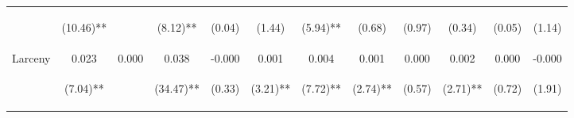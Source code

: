 \begin{tabular}{lccccccccccc}
 & \begin{footnotesize}(10.46)**\end{footnotesize} & \begin{footnotesize}\end{footnotesize} & \begin{footnotesize}(8.12)**\end{footnotesize} & \begin{footnotesize}(0.04)\end{footnotesize} & \begin{footnotesize}(1.44)\end{footnotesize} & \begin{footnotesize}(5.94)**\end{footnotesize} & \begin{footnotesize}(0.68)\end{footnotesize} & \begin{footnotesize}(0.97)\end{footnotesize} & \begin{footnotesize}(0.34)\end{footnotesize} & \begin{footnotesize}(0.05)\end{footnotesize} & \begin{footnotesize}(1.14)\end{footnotesize}\\
\noalign{\smallskip}Larceny & 0.023 & 0.000 & 0.038 & -0.000 & 0.001 & 0.004 & 0.001 & 0.000 & 0.002 & 0.000 & -0.000\\
 & \begin{footnotesize}(7.04)**\end{footnotesize} & \begin{footnotesize}\end{footnotesize} & \begin{footnotesize}(34.47)**\end{footnotesize} & \begin{footnotesize}(0.33)\end{footnotesize} & \begin{footnotesize}(3.21)**\end{footnotesize} & \begin{footnotesize}(7.72)**\end{footnotesize} & \begin{footnotesize}(2.74)**\end{footnotesize} & \begin{footnotesize}(0.57)\end{footnotesize} & \begin{footnotesize}(2.71)**\end{footnotesize} & \begin{footnotesize}(0.72)\end{footnotesize} & \begin{footnotesize}(1.91)\end{footnotesize}\\

\end{tabular}
